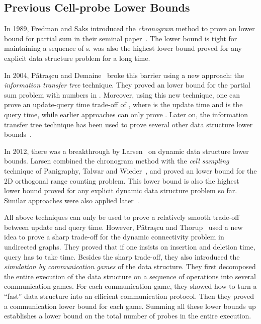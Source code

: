 \documentclass[11pt]{article}
\begin{document}
\subsection{Previous Cell-probe Lower Bounds}\label{subsectplb}

In 1989, Fredman and Saks introduced the \emph{chronogram} method to prove an  lower bound for partial sum in their seminal paper~\cite{FS89}. The lower bound is tight for maintaining a sequence of s.  was also the highest lower bound proved for any explicit data structure problem for a long time.

In 2004, P\v{a}tra\c{s}cu and Demaine~\cite{PD04a} broke this  barrier using a new approach: the \emph{information transfer tree} technique. They proved an  lower bound for the partial sum problem with numbers in . Moreover, using this new technique, one can prove an update-query time trade-off of , where  is the update time and  is the query time, while earlier approaches can only prove . Later on, the information transfer tree technique has been used to prove several other data structure lower bounds~\cite{PD04b, CJS15, CJ11, CJS13}.

In 2012, there was a breakthrough by Larsen~\cite{Larsen12a} on dynamic data structure lower bounds. Larsen combined the chronogram method with the \emph{cell sampling} technique of Panigraphy, Talwar and Wieder~\cite{PTW10}, and proved an  lower bound for the 2D orthogonal range counting problem. This lower bound is also the highest lower bound proved for any explicit dynamic data structure problem so far. Similar approaches were also applied later~\cite{Larsen12b, CGL15}. 

All above techniques can only be used to prove a relatively smooth trade-off between update and query time. However, P\v{a}tra\c{s}cu and Thorup~\cite{PT11} used a new idea to prove a sharp trade-off for the dynamic connectivity problem in undirected graphs. They proved that if one insists on  insertion and deletion time, query has to take  time. Besides the sharp trade-off, they also introduced the \emph{simulation by communication games} of the data structure. They first decomposed the entire execution of the data structure on a sequence of operations into several communication games. For each communication game, they showed how to turn a ``fast'' data structure into an efficient communication protocol. Then they proved a communication lower bound for each game. Summing all these lower bounds up establishes a lower bound on the total number of probes in the entire execution. 
\end{document}
